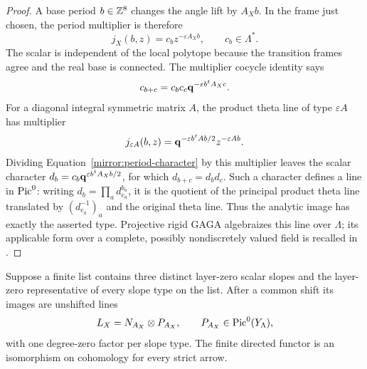 \begin{proof}
A base period $b\in\mathbb Z^8$ changes the angle lift by $A_Xb$.
In the frame just chosen, the period multiplier is therefore
\begin{equation}
 j_X(b,z)=c_bz^{-\varepsilon A_Xb},\qquad c_b\in\Lambda^*.
 \label{mirror:period-character}
\end{equation}
The scalar is independent of the local polytope because the
transition frames agree and the real base is connected.  The
multiplier cocycle identity says
\[
 c_{b+c}=c_bc_c\mathbf q^{-\varepsilon b^tA_Xc}.
\]
For a diagonal integral symmetric matrix $A$, the product theta line
of type $\varepsilon A$ has multiplier
\[
 j_{\varepsilon A}(b,z)
   =\mathbf q^{-\varepsilon b^tAb/2}z^{-\varepsilon Ab}.
\]
Dividing Equation~\eqref{mirror:period-character} by this multiplier
leaves the scalar character
$d_b=c_b\mathbf q^{\varepsilon b^tA_Xb/2}$, for which
$d_{b+c}=d_bd_c$.  Such a character defines a line in $\operatorname{Pic}^0$:
writing $d_b=\prod_a d_{e_a}^{b_a}$, it is the quotient of the
principal product theta line translated by
$(d_{e_a}^{-1})_a$ and the original theta line.  Thus the analytic
image has exactly the asserted type.  Projective rigid GAGA
algebraizes this line over $\Lambda$; its applicable form over a
complete, possibly nondiscretely valued field is recalled in
\cite[p.~502]{conrad-gaga}.
\end{proof}

\begin{lemma}
\label{mirror:normalization}
Suppose a finite list contains three distinct layer-zero scalar
slopes and the layer-zero representative of every slope type on the
list.  After a common shift its images are unshifted lines
\begin{equation}
 L_X=N_{A_X}\otimes P_{A_X},\qquad
 P_{A_X}\in\operatorname{Pic}^0(Y_\Lambda),
 \label{mirror:normalized-lines}
\end{equation}
with one degree-zero factor per slope type.  The finite directed
functor is an isomorphism on cohomology for every strict arrow.
\end{lemma}

